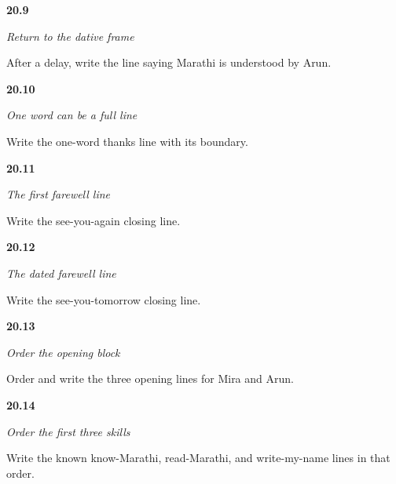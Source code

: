 \noindent\begin{minipage}[t]{\linewidth}
\raggedright
\hypertarget{review-MR-A1M09-understanding-line-check}{\textbf{20.9}} \emph{Return to the dative frame}\par
\small After a delay, write the line saying Marathi is understood by Arun.
\end{minipage}\par\medskip

\noindent\begin{minipage}[t]{\linewidth}
\raggedright
\hypertarget{review-MR-A1M10-thanks-line-check}{\textbf{20.10}} \emph{One word can be a full line}\par
\small Write the one-word thanks line with its boundary.
\end{minipage}\par\medskip

\noindent\begin{minipage}[t]{\linewidth}
\raggedright
\hypertarget{review-MR-A1M11-again-line-check}{\textbf{20.11}} \emph{The first farewell line}\par
\small Write the see-you-again closing line.
\end{minipage}\par\medskip

\noindent\begin{minipage}[t]{\linewidth}
\raggedright
\hypertarget{review-MR-A1M12-tomorrow-line-check}{\textbf{20.12}} \emph{The dated farewell line}\par
\small Write the see-you-tomorrow closing line.
\end{minipage}\par\medskip

\noindent\begin{minipage}[t]{\linewidth}
\raggedright
\hypertarget{review-MR-A1M13-opening-block-check}{\textbf{20.13}} \emph{Order the opening block}\par
\small Order and write the three opening lines for Mira and Arun.
\end{minipage}\par\medskip

\noindent\begin{minipage}[t]{\linewidth}
\raggedright
\hypertarget{review-MR-A1M14-skills-block-one-check}{\textbf{20.14}} \emph{Order the first three skills}\par
\small Write the known know-Marathi, read-Marathi, and write-my-name lines in that order.
\end{minipage}\par\medskip

